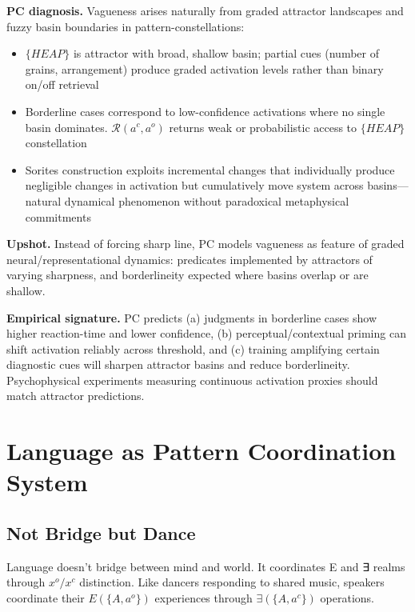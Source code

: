 \documentclass[12pt]{article}
\providecommand{\tightlist}{}   %
\begin{document}
\textbf{PC diagnosis.} Vagueness arises naturally from graded attractor landscapes and fuzzy basin boundaries in pattern-constellations:

\begin{itemize}
\tightlist
\item
  \(\{HEAP\}\) is attractor with broad, shallow basin; partial cues (number of grains, arrangement) produce graded activation levels rather than binary on/off retrieval
\item
  Borderline cases correspond to low-confidence activations where no single basin dominates. \(\mathcal{R}(a^c, a^o)\) returns weak or probabilistic access to \(\{HEAP\}\) constellation
\item
  Sorites construction exploits incremental changes that individually produce negligible changes in activation but cumulatively move system across basins---natural dynamical phenomenon without paradoxical metaphysical commitments
\end{itemize}

\textbf{Upshot.} Instead of forcing sharp line, PC models vagueness as feature of graded neural/representational dynamics: predicates implemented by attractors of varying sharpness, and borderlineity expected where basins overlap or are shallow.

\textbf{Empirical signature.} PC predicts (a) judgments in borderline cases show higher reaction-time and lower confidence, (b) perceptual/contextual priming can shift activation reliably across threshold, and (c) training amplifying certain diagnostic cues will sharpen attractor basins and reduce borderlineity. Psychophysical experiments measuring continuous activation proxies should match attractor predictions.

\section{Language as Pattern Coordination System}\label{language-as-pattern-coordination-system}

\subsection{Not Bridge but Dance}\label{not-bridge-but-dance}

Language doesn't bridge between mind and world. It coordinates E and ∃ realms through \(x^o/x^c\) distinction. Like dancers responding to shared music, speakers coordinate their \(E(\{A, a^o\})\) experiences through \(\exists(\{A, a^c\})\) operations.
\end{document}
